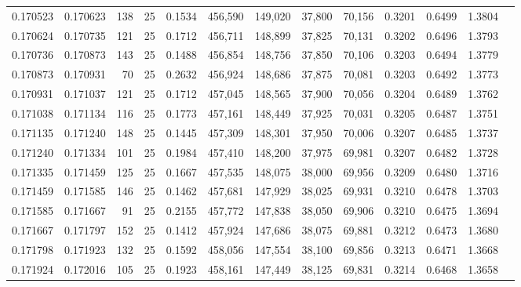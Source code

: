 \begin{tabular}{rrrrrrrrrrrrr}
0.170523 & 0.170623 &   138 &  25 &                                     0.1534 & 456,590 & 149,020 &  37,800 &  70,156 & 0.3201 & 0.6499 & 1.3804 \\
0.170624 & 0.170735 &   121 &  25 &                                     0.1712 & 456,711 & 148,899 &  37,825 &  70,131 & 0.3202 & 0.6496 & 1.3793 \\
0.170736 & 0.170873 &   143 &  25 &                                     0.1488 & 456,854 & 148,756 &  37,850 &  70,106 & 0.3203 & 0.6494 & 1.3779 \\
0.170873 & 0.170931 &    70 &  25 &                                     0.2632 & 456,924 & 148,686 &  37,875 &  70,081 & 0.3203 & 0.6492 & 1.3773 \\
0.170931 & 0.171037 &   121 &  25 &                                     0.1712 & 457,045 & 148,565 &  37,900 &  70,056 & 0.3204 & 0.6489 & 1.3762 \\
0.171038 & 0.171134 &   116 &  25 &                                     0.1773 & 457,161 & 148,449 &  37,925 &  70,031 & 0.3205 & 0.6487 & 1.3751 \\
0.171135 & 0.171240 &   148 &  25 &                                     0.1445 & 457,309 & 148,301 &  37,950 &  70,006 & 0.3207 & 0.6485 & 1.3737 \\
0.171240 & 0.171334 &   101 &  25 &                                     0.1984 & 457,410 & 148,200 &  37,975 &  69,981 & 0.3207 & 0.6482 & 1.3728 \\
0.171335 & 0.171459 &   125 &  25 &                                     0.1667 & 457,535 & 148,075 &  38,000 &  69,956 & 0.3209 & 0.6480 & 1.3716 \\
0.171459 & 0.171585 &   146 &  25 &                                     0.1462 & 457,681 & 147,929 &  38,025 &  69,931 & 0.3210 & 0.6478 & 1.3703 \\
0.171585 & 0.171667 &    91 &  25 &                                     0.2155 & 457,772 & 147,838 &  38,050 &  69,906 & 0.3210 & 0.6475 & 1.3694 \\
0.171667 & 0.171797 &   152 &  25 &                                     0.1412 & 457,924 & 147,686 &  38,075 &  69,881 & 0.3212 & 0.6473 & 1.3680 \\
0.171798 & 0.171923 &   132 &  25 &                                     0.1592 & 458,056 & 147,554 &  38,100 &  69,856 & 0.3213 & 0.6471 & 1.3668 \\
0.171924 & 0.172016 &   105 &  25 &                                     0.1923 & 458,161 & 147,449 &  38,125 &  69,831 & 0.3214 & 0.6468 & 1.3658 \\

\end{tabular}
